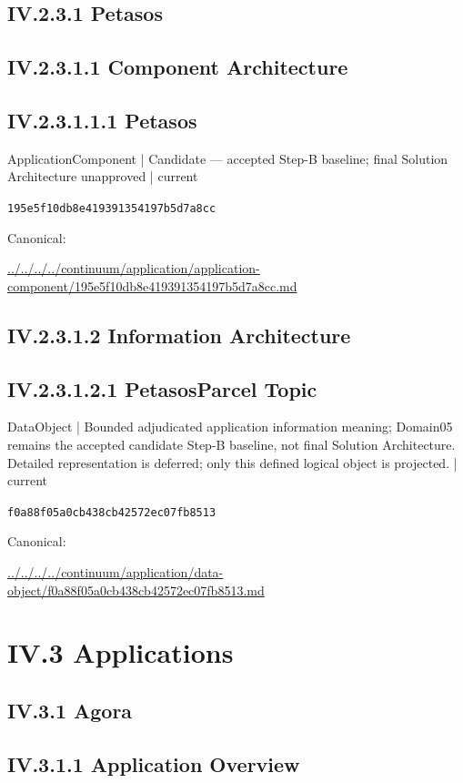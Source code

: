 \documentclass[10pt,a4paper]{article}
\begin{document}
\subsection*{IV.2.3.1 Petasos}
\subsection*{IV.2.3.1.1 Component Architecture}
\subsection*{IV.2.3.1.1.1 Petasos}
{\small ApplicationComponent | Candidate — accepted Step-B baseline; final Solution Architecture unapproved | current}\par
\texttt{195e5f10db8e419391354197b5d7a8cc}\par
Canonical: \par
{\footnotesize\url{../../../../continuum/application/application-component/195e5f10db8e419391354197b5d7a8cc.md}}\par
\subsection*{IV.2.3.1.2 Information Architecture}
\subsection*{IV.2.3.1.2.1 PetasosParcel Topic}
{\small DataObject | Bounded adjudicated application information meaning; Domain05 remains the accepted candidate Step-B baseline, not final Solution Architecture. Detailed representation is deferred; only this defined logical object is projected. | current}\par
\texttt{f0a88f05a0cb438cb42572ec07fb8513}\par
Canonical: \par
{\footnotesize\url{../../../../continuum/application/data-object/f0a88f05a0cb438cb42572ec07fb8513.md}}\par
\section*{IV.3 Applications}
\subsection*{IV.3.1 Agora}
\subsection*{IV.3.1.1 Application Overview}
\end{document}
